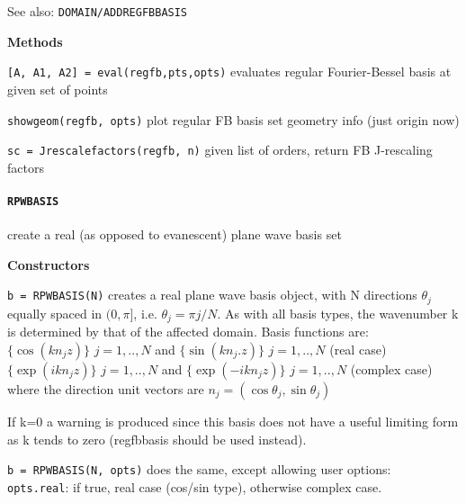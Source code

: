 See also: {\tt DOMAIN/ADDREGFBBASIS}

\textbf{Methods}

{\tt [A, A1, A2] = eval(regfb,pts,opts)} evaluates regular
Fourier-Bessel basis at given set of points 

{\tt showgeom(regfb, opts)} plot regular FB basis set geometry info
(just origin now)

{\tt sc = Jrescalefactors(regfb, n)} given list of orders, return FB
J-rescaling factors

\newpage

\paragraph{\tt RPWBASIS} create a real (as opposed to evanescent)
plane wave basis set

\textbf{Constructors}

{\tt b = RPWBASIS(N)} creates a real plane wave basis object, with N directions
   $\theta_j$ equally spaced in $(0,\pi]$, i.e. $\theta_j = \pi j/N$. As with all basis
   types, the wavenumber k is determined by that of the affected domain.
   Basis functions are:\\
      $\{\cos(k n_j z)\}$ $j=1,..,N$ and $\{\sin(k n_j.z)\}$ $j=1,..,N$       (real case)\\
   $\{\exp(i k n_j z)\}$ $j=1,..,N$ and $\{\exp(-i k n_j z)\}$ $j=1,..,N$  (complex case)\\
     where the direction unit vectors are $n_j = (\cos\theta_j, \sin\theta_j)$

   If k=0 a warning is produced since this basis does not have a useful
   limiting form as k tends to zero (regfbbasis should be used instead).

  {\tt b = RPWBASIS(N, opts)} does the same, except allowing user options:\\
   {\tt opts.real}: if true, real case (cos/sin type), otherwise complex case.





















